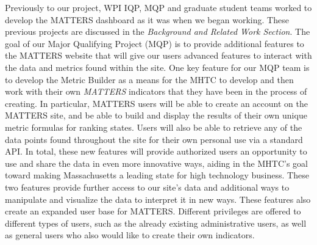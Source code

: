 	Previously to our project, WPI IQP, MQP and graduate student teams worked to 
	develop the MATTERS dashboard as it was when we began working. These previous projects are discussed 
	in the \textit{Background and Related Work Section}. The goal of our 
	Major Qualifying Project (MQP) is to provide additional features to the MATTERS 
	website that will give our users advanced features to interact with the data and 
	metrics found within the site. One key feature for our MQP team is to develop the Metric Builder 
	as a means for the MHTC to develop and then work with their own 
	\textit{MATTERS} indicators that they have been in the process of creating. In particular, MATTERS users will be able to 
	create an account on the MATTERS site, and be able to build and display the 
	results of their own unique metric formulas for ranking states. Users will 
	also be able to retrieve any of the data points found throughout the site 
	for their own personal use via a standard API. In total, these new 
	features will provide authorized users an opportunity to use and share the 
	data in even more innovative ways, aiding in the MHTC's goal toward making 
	Massachusetts a leading state for high technology business. These two features 
	provide further access to our site's data and additional ways to manipulate and 
	visualize the data to interpret it in new ways. These features also create an 
	expanded user base for MATTERS. Different privileges are offered to different types of 
	users, such as the already existing administrative users, as well as general users who 
	also would like to create their own indicators.